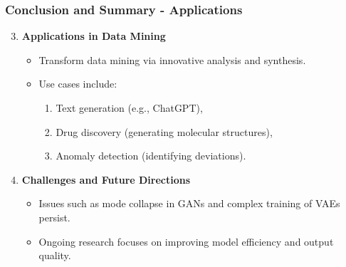 \documentclass[aspectratio=169]{beamer}
\begin{document}
\begin{frame}[fragile]
    \frametitle{Conclusion and Summary - Applications}
    \begin{enumerate}
        \setcounter{enumi}{2}  %
        \item \textbf{Applications in Data Mining}
            \begin{itemize}
                \item Transform data mining via innovative analysis and synthesis.
                \item Use cases include:
                    \begin{enumerate}
                        \item Text generation (e.g., ChatGPT),
                        \item Drug discovery (generating molecular structures),
                        \item Anomaly detection (identifying deviations).
                    \end{enumerate}
            \end{itemize}
        
        \item \textbf{Challenges and Future Directions}
            \begin{itemize}
                \item Issues such as mode collapse in GANs and complex training of VAEs persist.
                \item Ongoing research focuses on improving model efficiency and output quality.
            \end{itemize}
    \end{enumerate}
\end{frame}
\end{document}
